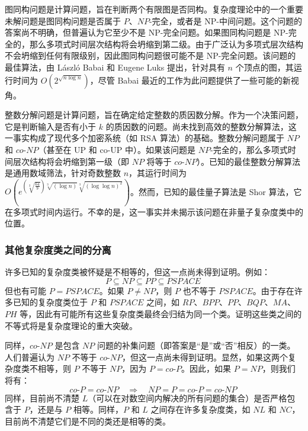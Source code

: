 图同构问题是计算问题，旨在判断两个有限图是否同构。复杂度理论中的一个重要未解问题是图同构问题是否属于 \( P \)、\( NP \)-完全，或者是 NP-中间问题。这个问题的答案尚不明确，但普遍认为它至少不是 NP-完全问题。如果图同构问题是 NP-完全的，那么多项式时间层次结构将会坍缩到第二级。由于广泛认为多项式层次结构不会坍缩到任何有限级别，因此图同构问题很可能不是 NP-完全问题。该问题的最佳算法，由 László Babai 和 Eugene Luks 提出，针对具有 \( n \) 个顶点的图，其运行时间为 \( O(2^{\sqrt{n \log n}}) \)，尽管 Babai 最近的工作为此问题提供了一些可能的新视角。

整数分解问题是计算问题，旨在确定给定整数的质因数分解。作为一个决策问题，它是判断输入是否有小于 \( k \) 的质因数的问题。尚未找到高效的整数分解算法，这一事实构成了现代多个加密系统（如 RSA 算法）的基础。整数分解问题属于 \( NP \) 和 \( co\text{-}NP \)（甚至在 UP 和 co-UP 中）。如果该问题是 \( NP \)-完全的，那么多项式时间层次结构将会坍缩到第一级（即 \( NP \) 将等于 \( co\text{-}NP \)）。已知的最佳整数分解算法是通用数域筛法，针对奇数整数 \( n \)，其运行时间为 \( O(e^{\left({\sqrt[3]{\frac{64}{9}}}\right)\sqrt[3]{(\log n)}\sqrt[3]{(\log \log n)^2}}) \)。然而，已知的最佳量子算法是 Shor 算法，它在多项式时间内运行。不幸的是，这一事实并未揭示该问题在非量子复杂度类中的位置。

\subsubsection{其他复杂度类之间的分离}  
许多已知的复杂度类被怀疑是不相等的，但这一点尚未得到证明。例如：
\[
P \subseteq NP \subseteq PP \subseteq PSPACE~
\]
但也有可能 \( P = PSPACE \)。如果 \( P \neq NP \)，则 \( P \) 也不等于 \( PSPACE \)。由于存在许多已知的复杂度类位于 \( P \) 和 \( PSPACE \) 之间，如 \( RP \)、\( BPP \)、\( PP \)、\( BQP \)、\( MA \)、\( PH \) 等，因此有可能所有这些复杂度类最终会归结为同一个类。证明这些类之间的不等式将是复杂度理论的重大突破。

同样，\( co\text{-}NP \) 是包含 \( NP \) 问题的补集问题（即答案是“是”或“否”相反）的一类。人们普遍认为 \( NP \) 不等于 \( co\text{-}NP \)，但这一点尚未得到证明。显然，如果这两个复杂度类不相等，则 \( P \) 不等于 \( NP \)，因为 \( P = co\text{-}P \)。因此，如果 \( P = NP \)，则我们将有：
\[
co\text{-}P = co\text{-}NP \quad \Rightarrow \quad NP = P = co\text{-}P = co\text{-}NP~
\]
同样，目前尚不清楚 \( L \)（可以在对数空间内解决的所有问题的集合）是否严格包含于 \( P \)，还是与 \( P \) 相等。同样，\( P \) 和 \( L \) 之间存在许多复杂度类，如 \( NL \) 和 \( NC \)，目前尚不清楚它们是不同的类还是相等的类。

